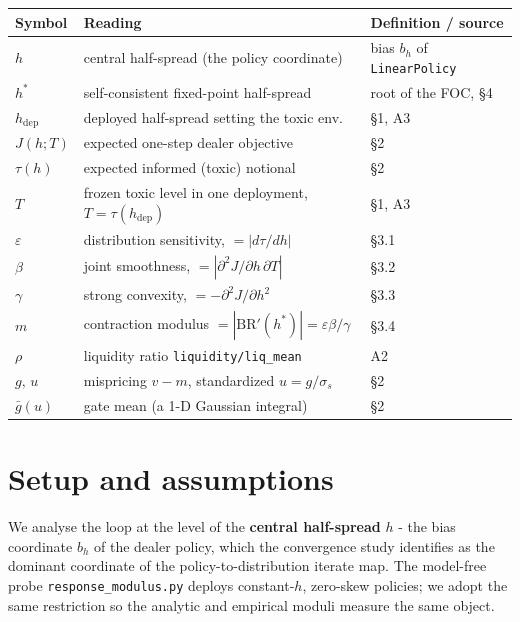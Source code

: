 \documentclass[11pt]{article}
\newcommand{\eps}{\varepsilon}
\newcommand{\gbar}{\bar g}
\newcommand{\hdep}{h_{\mathrm{dep}}}
\newcommand{\code}[1]{\texttt{#1}}
\newcommand{\BR}{\mathrm{BR}}
\begin{document}
\begin{center}
\begin{tabular}{@{}lll@{}}
\toprule
Symbol & Reading & Definition / source \\
\midrule
$h$       & central half-spread (the policy coordinate) & bias $b_h$ of \code{LinearPolicy} \\
$h^*$     & self-consistent fixed-point half-spread     & root of the FOC, \S4 \\
$\hdep$   & deployed half-spread setting the toxic env. & \S1, A3 \\
$J(h;T)$  & expected one-step dealer objective          & \S2 \\
$\tau(h)$ & expected informed (toxic) notional          & \S2 \\
$T$       & frozen toxic level in one deployment, $T=\tau(\hdep)$ & \S1, A3 \\
$\eps$    & distribution sensitivity, $=|d\tau/dh|$     & \S3.1 \\
$\beta$   & joint smoothness, $=|\partial^2 J/\partial h\,\partial T|$ & \S3.2 \\
$\gamma$  & strong convexity, $=-\partial^2 J/\partial h^2$ & \S3.3 \\
$m$       & contraction modulus $=|\BR'(h^*)|=\eps\beta/\gamma$ & \S3.4 \\
$\rho$    & liquidity ratio \code{liquidity/liq\_mean}  & A2 \\
$g,\,u$   & mispricing $v-m$, standardized $u=g/\sigma_s$ & \S2 \\
$\gbar(u)$& gate mean (a 1-D Gaussian integral)         & \S2 \\
\bottomrule
\end{tabular}
\end{center}

\section{Setup and assumptions}

We analyse the loop at the level of the \textbf{central half-spread} $h$ - the
bias coordinate $b_h$ of the dealer policy, which the convergence study
identifies as the dominant coordinate of the policy-to-distribution iterate map.
The model-free probe \code{response\_modulus.py} deploys constant-$h$, zero-skew
policies; we adopt the same restriction so the analytic and empirical moduli
measure the same object.
\end{document}
